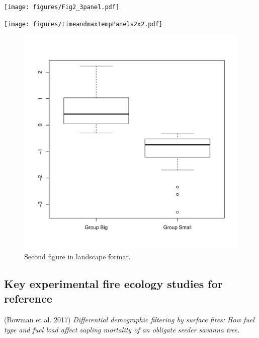 \documentclass[11pt,a4paper]{article}
\newcommand{\blandscape}{\begin{landscape}}
\newcommand{\elandscape}{\end{landscape}}
\begin{document}
\clearpage

\listoffigures


\newpage

\texttt{[image: figures/Fig2\_3panel.pdf]} \newpage

\newpage

\texttt{[image: figures/timeandmaxtempPanels2x2.pdf]}

\newpage

\blandscape

\begin{figure}
\centering
\includegraphics{figures/Fig2-1.pdf}
\caption{Second figure in landscape format.}
\end{figure}

\elandscape

\clearpage

\hypertarget{key-experimental-fire-ecology-studies-for-reference}{%
\subsection{Key experimental fire ecology studies for
reference}\label{key-experimental-fire-ecology-studies-for-reference}}

(Bowman et al. 2017) \emph{Differential demographic filtering by surface
fires: How fuel type and fuel load affect sapling mortality of an
obligate seeder savanna tree.}
\end{document}
